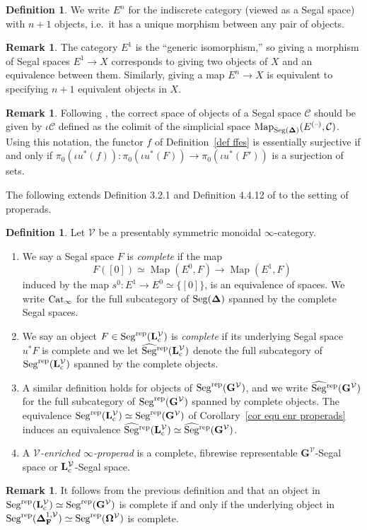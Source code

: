 \documentclass{amsart}
\numberwithin{theorem}{subsection}
\theoremstyle{definition}
\newtheorem{definition}[theorem]{Definition}
\newtheorem{defn}[theorem]{Definition}
\newtheorem{remark}[theorem]{Remark}
\newcommand{\finsetskel}{\mathbf{F}}
\newcommand{\xMap}{\operatorname{Map}}
\newcommand{\Map}{\operatorname{Map}}
\newcommand{\xcc}{\mathcal{C}}
\newcommand{\xV}{\mathcal{V}}
\newcommand{\name}[1]{\ensuremath{\text{\textup{#1}}}}
\newcommand{\simp}{\mathbf{\Delta}}
\newcommand{\bbO}{\mathbf{\Omega}}
\newcommand{\levelg}{\mathbf{L}}
\newcommand{\levelgconn}{\levelg_{\name{c}}}
\newcommand{\levelcV}{\levelgconn^{\xV}}
\newcommand{\bbY}{\mathbf{G}}
\newcommand{\bbYV}{\bbY^{\xV}}
\newcommand{\Seg}{\name{Seg}}
\newcommand{\blank}{\text{\textendash}}
\newcommand{\Cat}{\name{Cat}}
\newcommand{\CatI}{\Cat_{\infty}}
\newcommand{\Segrep}{\Seg^{\name{rep}}}
\newcommand{\Segrepc}{\widehat{\Seg}\vphantom{\Seg}^{\name{rep}}}
\begin{document}
\begin{definition}\label{def En}
We write $E^{n}$ for the indiscrete category (viewed as a Segal space) with $n+1$ objects, i.e.\ it has a unique morphism between any pair of objects.
\end{definition}
\begin{remark}
	The category $E^{1}$ is the ``generic isomorphism,'' so giving a morphism of Segal spaces $E^{1} \to X$ corresponds to giving two objects of $X$ and an equivalence between them.
	Similarly, giving a map $E^n\to X$ is equivalent to specifying $n+1$ equivalent objects in $X$.
\end{remark}

\begin{remark}
	Following \cite{Rezk}, the correct space of objects of a Segal space $\xcc$ should be given by $\iota \xcc$ defined as the colimit of the simplicial space $\xMap_{\Seg(\simp)}(E^{(\blank)},\xcc) $. Using this notation, the functor $f$ of Definition~\ref{def ffes} is essentially surjective if and only if 
	$\pi_0(\iota u^*(f))\colon \pi_0(\iota u^*(F))\to \pi_0(\iota u^*(F'))$ is a surjection of sets.
\end{remark}

The following extends Definition 3.2.1 and Definition 4.4.12 of \cite{ChuHaugseng} to the setting of properads.

\begin{defn}\label{def completness}
	Let $\xV$ be a presentably symmetric monoidal $\infty$-category.
	\begin{enumerate}
		\item We say a Segal space $F$ is \emph{complete} if the map
		\[F([0])\simeq \Map(E^0, F) \to \Map(E^{1}, F)\]
		induced by the map $s^0\colon E^{1} \to E^{0} \simeq \{[0]\}$, is an equivalence of spaces. 
We write $\CatI$ for the full subcategory of $\Seg(\simp)$ spanned by the complete Segal spaces.
\item We say an object $F\in \Segrep(\levelcV)$ is \emph{complete} if its underlying Segal space $u^*F$ is complete and we let $\Segrepc(\levelcV)$ denote the full subcategory of $\Segrep(\levelcV)$ spanned by the complete objects.
\item 
A similar definition holds for objects of $\Segrep(\bbYV)$, and we write $\Segrepc(\bbYV)$ for the full subcategory of $\Segrep(\bbYV)$ spanned by complete objects.
The equivalence $\Segrep(\levelcV)\simeq \Segrep(\bbYV)$ of Corollary~\ref{cor equ enr properads} induces an equivalence $\Segrepc(\levelcV) \simeq \Segrepc(\bbYV)$.
\item A \emph{$\xV$-enriched $\infty$-properad} is a complete, fibrewise representable $\bbYV$-Segal space or $\levelcV$-Segal space. 
\end{enumerate}
\end{defn}
\begin{remark}
	It follows from the previous definition and \cite[Definition 3.2.1]{ChuHaugseng} that an object in $\Segrep(\levelcV)\simeq \Segrep(\bbYV)$ is complete if and only if the underlying object in $\Segrep(\simp^{1,\xV}_{\finsetskel})\simeq \Segrep(\bbO^\xV)$ is complete.
\end{remark}
\end{document}
